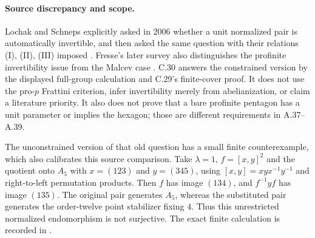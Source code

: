 \documentclass[11pt]{article}
\begin{document}
\paragraph{Source discrepancy and scope.}
Lochak and Schneps explicitly asked in 2006 whether a unit normalized
pair is automatically invertible, and then asked the same question
with their relations (I), (II), (III) imposed
\cite[Question 1.1]{A_LS2006}. Fresse's later survey also distinguishes
the profinite invertibility issue from the Malcev case
\cite[\S1.1, manuscript p.~14]{CEFresse2019}.
C.30 answers the constrained version by the displayed full-group
calculation and C.29's finite-cover proof. It does not use the
pro-$p$ Frattini criterion, infer invertibility merely from
abelianization, or claim a literature priority. It also does not
prove that a bare profinite pentagon has a unit parameter or implies
the hexagon; those are different requirements in A.37--A.39.

The unconstrained version of that old question has a small finite
counterexample, which also calibrates this source comparison.
Take $\lambda=1$, $f=[x,y]^2$ and the quotient onto $A_5$ with
$x=(123)$ and $y=(345)$, using $[x,y]=xyx^{-1}y^{-1}$ and
right-to-left permutation products. Then $f$ has image $(134)$,
and $f^{-1}yf$ has image $(135)$. The original pair generates
$A_5$, whereas the substituted pair generates the order-twelve
point stabilizer fixing $4$. Thus this unrestricted normalized
endomorphism is not surjective. The exact finite calculation is
recorded in .
\end{document}
